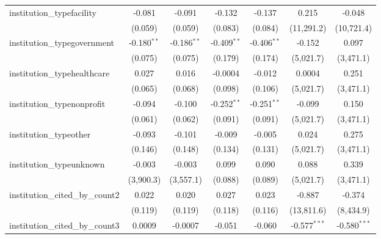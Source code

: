\begin{tabular}{lcccccc}
   institution\_typefacility             & -0.081         & -0.091         & -0.132        & -0.137        & 0.215          & -0.048\\   
                                         & (0.059)        & (0.059)        & (0.083)       & (0.084)       & (11,291.2)     & (10,721.4)\\   
   institution\_typegovernment           & -0.180$^{**}$  & -0.186$^{**}$  & -0.409$^{**}$ & -0.406$^{**}$ & -0.152         & 0.097\\   
                                         & (0.075)        & (0.075)        & (0.179)       & (0.174)       & (5,021.7)      & (3,471.1)\\   
   institution\_typehealthcare           & 0.027          & 0.016          & -0.0004       & -0.012        & 0.0004         & 0.251\\   
                                         & (0.065)        & (0.068)        & (0.098)       & (0.106)       & (5,021.7)      & (3,471.1)\\   
   institution\_typenonprofit            & -0.094         & -0.100         & -0.252$^{**}$ & -0.251$^{**}$ & -0.099         & 0.150\\   
                                         & (0.061)        & (0.062)        & (0.091)       & (0.091)       & (5,021.7)      & (3,471.1)\\   
   institution\_typeother                & -0.093         & -0.101         & -0.009        & -0.005        & 0.024          & 0.275\\   
                                         & (0.146)        & (0.148)        & (0.134)       & (0.131)       & (5,021.7)      & (3,471.1)\\   
   institution\_typeunknown              & -0.003         & -0.003         & 0.099         & 0.090         & 0.088          & 0.339\\   
                                         & (3,900.3)      & (3,557.1)      & (0.088)       & (0.089)       & (5,021.7)      & (3,471.1)\\   
   institution\_cited\_by\_count2        & 0.022          & 0.020          & 0.027         & 0.023         & -0.887         & -0.374\\   
                                         & (0.119)        & (0.119)        & (0.118)       & (0.116)       & (13,811.6)     & (8,434.9)\\   
   institution\_cited\_by\_count3        & 0.0009         & -0.0007        & -0.051        & -0.060        & -0.577$^{***}$ & -0.580$^{***}$\\   

\end{tabular}
